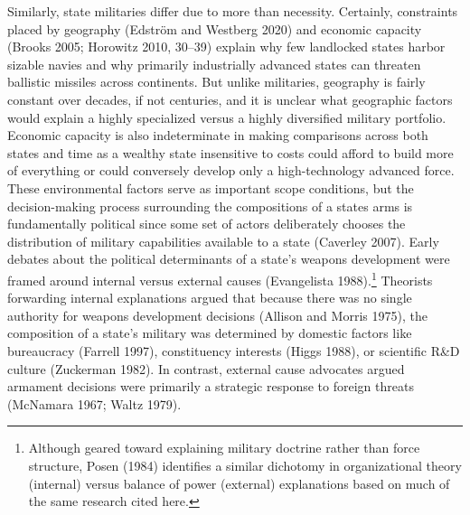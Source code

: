 \documentclass[
  12,
  letterpaper,
  DIV=11,
  numbers=noendperiod]{scrartcl}
\begin{document}
Similarly, state militaries differ due to more than necessity.
Certainly, constraints placed by geography (Edström and Westberg 2020)
and economic capacity (Brooks 2005; Horowitz 2010, 30--39) explain why
few landlocked states harbor sizable navies and why primarily
industrially advanced states can threaten ballistic missiles across
continents. But unlike militaries, geography is fairly constant over
decades, if not centuries, and it is unclear what geographic factors
would explain a highly specialized versus a highly diversified military
portfolio. Economic capacity is also indeterminate in making comparisons
across both states and time as a wealthy state insensitive to costs
could afford to build more of everything or could conversely develop
only a high-technology advanced force. These environmental factors serve
as important scope conditions, but the decision-making process
surrounding the compositions of a states arms is fundamentally political
since some set of actors deliberately chooses the distribution of
military capabilities available to a state (Caverley 2007). Early
debates about the political determinants of a state's weapons
development were framed around internal versus external causes
(Evangelista 1988).\footnote{Although geared toward explaining military
  doctrine rather than force structure, Posen (1984) identifies a
  similar dichotomy in organizational theory (internal) versus balance
  of power (external) explanations based on much of the same research
  cited here.} Theorists forwarding internal explanations argued that
because there was no single authority for weapons development decisions
(Allison and Morris 1975), the composition of a state's military was
determined by domestic factors like bureaucracy (Farrell 1997),
constituency interests (Higgs 1988), or scientific R\&D culture
(Zuckerman 1982). In contrast, external cause advocates argued armament
decisions were primarily a strategic response to foreign threats
(McNamara 1967; Waltz 1979).
\end{document}
